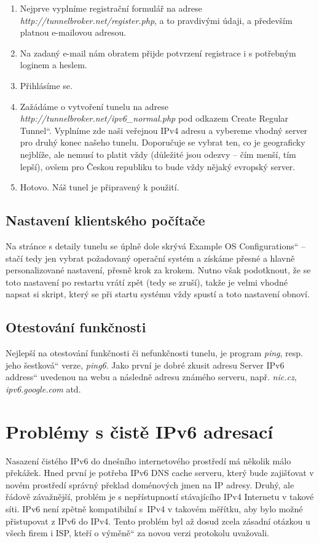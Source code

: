 \documentclass[12pt]{report}
\newcommand\uv[1]{\quotedblbase #1\textquotedblleft}
\begin{document}
\begin{enumerate}
\item Nejprve vyplníme registrační formulář na adrese \textit{http://tunnelbroker.net/register.php}, a to pravdivými údaji, a především platnou e-mailovou adresou.
\item Na zadaný e-mail nám obratem přijde potvrzení registrace i s potřebným loginem a heslem.
\item Přihlásíme se.
\item Zažádáme o vytvoření tunelu na adrese \textit{http://tunnelbroker.net/ipv6\_normal.php} pod odkazem \uv{Create Regular Tunnel}. Vyplníme zde naši veřejnou IPv4 adresu a vybereme vhodný server pro druhý konec našeho tunelu. Doporučuje se vybrat ten, co je geograficky nejblíže, ale nemusí to platit vždy (důležité jsou odezvy -- čím menší, tím lepší), ovšem pro Českou republiku to bude vždy nějaký evropský server.
\item Hotovo. Náš tunel je připravený k použití.
\end{enumerate}

\subsection{Nastavení klientského počítače}
Na stránce s detaily tunelu se úplně dole skrývá \uv{Example OS Configurations} -- stačí tedy jen vybrat požadovaný operační systém a získáme přesné a hlavně personalizované nastavení, přesně krok za krokem. Nutno však podotknout, že se toto nastavení po restartu vrátí zpět (tedy se zruší), takže je velmi vhodné napsat si skript, který se při startu systému vždy spustí a toto nastavení obnoví.

\subsection{Otestování funkčnosti}
Nejlepší na otestování funkčnosti či nefunkčnosti tunelu, je program \textit{ping}, resp. jeho \uv{šestková} verze, \textit{ping6}. Jako první je dobré zkusit adresu \uv{Server IPv6 address} uvedenou na webu a následně adresu známého serveru, např. \textit{nic.cz}, \textit{ipv6.google.com} atd.

\section{Problémy s čistě IPv6 adresací}
Nasazení čistého IPv6 do dnešního internetového prostředí má několik málo překážek. Hned první je potřeba IPv6 DNS cache serveru, který bude zajišťovat v novém prostředí správný překlad doménových jmen na IP adresy. Druhý, ale řádově závažnější, problém je s nepřístupností stávajícího IPv4 Internetu v takové síti. IPv6 není zpětně kompatibilní s~IPv4 v takovém měřítku, aby bylo možné přistupovat z IPv6 do IPv4. Tento problém byl až dosud zcela zásadní otázkou u všech firem i ISP, kteří o \uv{výměně} za novou verzi protokolu uvažovali.
\end{document}

